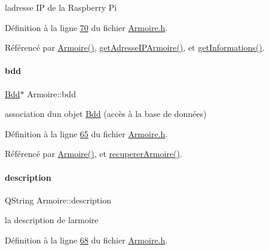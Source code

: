 l\textquotesingle{}adresse IP de la Raspberry Pi 



Définition à la ligne \hyperlink{_armoire_8h_source_l00070}{70} du fichier \hyperlink{_armoire_8h_source}{Armoire.\+h}.



Référencé par \hyperlink{_armoire_8cpp_source_l00022}{Armoire()}, \hyperlink{_armoire_8cpp_source_l00138}{get\+Adresse\+I\+P\+Armoire()}, et \hyperlink{_armoire_8cpp_source_l00078}{get\+Informations()}.

\mbox{\label{class_armoire_a555f656018e7b600987128cdc792e320}} 
\paragraph{\texorpdfstring{bdd}{bdd}}
{\footnotesize\ttfamily \hyperlink{class_bdd}{Bdd}$\ast$ Armoire\+::bdd\hspace{0.3cm}{\ttfamily [private]}}



association d\textquotesingle{}un objet \hyperlink{class_bdd}{Bdd} (accès à la base de données) 



Définition à la ligne \hyperlink{_armoire_8h_source_l00065}{65} du fichier \hyperlink{_armoire_8h_source}{Armoire.\+h}.



Référencé par \hyperlink{_armoire_8cpp_source_l00022}{Armoire()}, et \hyperlink{_armoire_8cpp_source_l00049}{recuperer\+Armoire()}.

\mbox{\label{class_armoire_aa18be328693d7602439c779e30156c02}} 
\paragraph{\texorpdfstring{description}{description}}
{\footnotesize\ttfamily Q\+String Armoire\+::description\hspace{0.3cm}{\ttfamily [private]}}



la description de l\textquotesingle{}armoire 



Définition à la ligne \hyperlink{_armoire_8h_source_l00068}{68} du fichier \hyperlink{_armoire_8h_source}{Armoire.\+h}.




